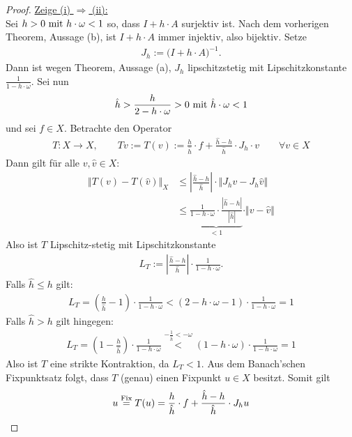 \begin{proof}
	\underline{Zeige (i) $\Rightarrow$ (ii):}\\
	Sei $h>0\mit h\cdot\omega<1$ so, dass $I+h\cdot A$ surjektiv ist. 
	Nach dem vorherigen Theorem, Aussage (b), ist $I+h\cdot A$ immer injektiv, also bijektiv. 
	Setze
	\begin{align*}
		J_h:=\big(I+h\cdot A\big)^{-1}.
	\end{align*}
	Dann ist wegen Theorem, Aussage (a), $J_h$ lipschitzstetig mit Lipschitzkonstante $\frac{1}{1-h\cdot\omega}$. 
	Sei nun 
	\begin{align*}
		\hat{h}>\frac{h}{2-h\cdot\omega}>0\mit\hat{h}\cdot\omega<1
	\end{align*}
	und sei $f\in X$. 
	Betrachte den Operator
	\begin{align*}
		T:X\to X,\qquad Tv:=T(v)
		:=\frac{h}{\hat{h}}\cdot f+\frac{\hat{h}-h}{\hat{h}}\cdot J_h\cdot v\qquad\forall v\in X
	\end{align*}
	Dann gilt für alle $v,\hat{v}\in X$:
	\begin{align*}
		\big\Vert T(v)-T(\hat{v})\big\Vert_X
		&\leq
		\left|\frac{\hat{h}-h}{\hat{h}}\right|\cdot\big\Vert J_h v-J_h \hat{v}\big\Vert\\
		&\leq
		\underbrace{\frac{1}{1-h\cdot\omega}\cdot\frac{|\hat{h}-h|}{|\hat{h}|}}_{<1}\cdot\Vert v-\hat{v}\Vert
		\end{align*}
	Also ist $T$ Lipschitz-stetig mit Lipschitzkonstante 
	\begin{align*}
		L_T:=\left|\frac{\hat{h}-h}{\hat{h}}\right|
		\cdot\frac{1}{1-h\cdot\omega}.
	\end{align*}
	Falls $\hat{h}\leq h$ gilt:
	\begin{align*}
		L_T=\left(\frac{h}{\hat{h}}-1\right)\cdot\frac{1}{1-h\cdot\omega}
		<
		(2-h\cdot\omega-1)\cdot\frac{1}{1-h\cdot\omega}
		=1
	\end{align*}
	Falls $\hat{h}>h$ gilt hingegen:
	\begin{align*}
		L_T=\left(1-\frac{h}{\hat{h}}\right)\cdot\frac{1}{1-h\cdot\omega}
		\stackrel{-\frac{1}{\hat{h}}<-\omega}{<}
		(1-h\cdot\omega)\cdot\frac{1}{1-h\cdot\omega}
		=1
	\end{align*}
	Also ist $T$ eine strikte Kontraktion, da $L_T<1$. 
	Aus dem Banach'schen Fixpunktsatz folgt, dass $T$ (genau) einen Fixpunkt $u\in X$ besitzt. 
	Somit gilt
	\begin{align*}
		u\stackeq{\text{Fix}}T(u)
		=\frac{h}{\hat{h}}\cdot f+\frac{\hat{h}-h}{\hat{h}}\cdot J_h u
	\end{align*}

\end{proof}
